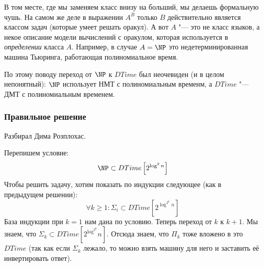 		\begin{Rem}
			В том месте, где мы заменяем класс внизу на больший, мы делаешь формальную чушь.
			На самом же деле в выражении $A^B$ только $B$ действительно является классом задач
			(которые умеет решать оракул).
			А вот $A$ "--- это не класс языков, а некое описание модели вычислений с оракулом,
			которая используется в \textit{определении} класса $A$.
			Например, в случае $A=\NP$ это недетерминированная машина Тьюринга, работающая полиномиальное время.

			По этому поводу переход от $\NP$ к $DTime$ был неочевиден (и в целом непонятный): $\NP$
			использует НМТ с полиномиальным временм, а $DTime$ "--- ДМТ с полиномиальным временем.
		\end{Rem}

	\subsubsection{Правильное решение}
		Разбирал Дима Розплохас.

		Перепишем условие:
		\[ \NP \subset DTime\left[2^{\log^2 n}\right] \]
		Чтобы решить задачу, хотим показать по индукции следующее (как в предыдущем решении):
		\[ \forall k \ge 1 \colon \Sigma_i \subset DTime\left[2^{\log^{2^k} n}\right] \]
		База индукции при $k=1$ нам дана по условию.
		Теперь переход от $k$ к $k+1$.
		Мы знаем, что $\Sigma_k \subset DTime\left[2^{\log^{2^k}} n\right]$.
		Отсюда знаем, что $\Pi_k$ тоже вложено в это $DTime$
		(так как если $\Sigma_k$ лежало, то можно взять машину для него и заставить её инвертировать ответ).

